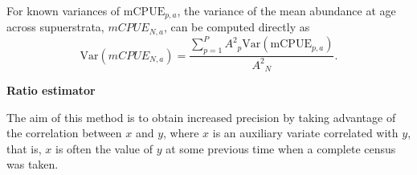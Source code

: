 \documentclass[a4paper 12pt]{article}
\numberwithin{equation}{section}
\begin{document}
\noindent For known variances of  $\mathrm{mCPUE}_{p,a} $, the variance of the mean abundance at age across supuerstrata,  $mCPUE_{N,a}$, can be computed directly as 
\begin{equation}
\mathrm{Var} \left(mCPUE_{N,a}\right) =  \frac{\sum_{p=1}^{P} {A^2}_{p}  \mathrm{Var}\left(\mathrm{mCPUE}_{p,a} \right)}{\displaystyle{A^2}_{N}}.
\end{equation}



{\bf Ratio estimator} 

The aim of this method is to obtain increased precision by taking advantage of the correlation between $x$ and $y$, where $x$ is an auxiliary variate correlated with $y$, that is, $x$ is often the value of $y$ at some previous time when a complete census was taken.
\end{document}
